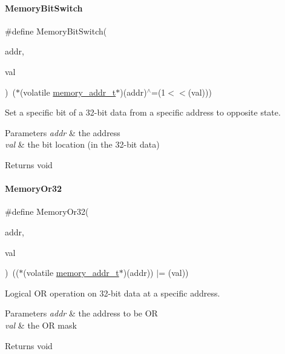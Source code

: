 \paragraph{\texorpdfstring{Memory\+Bit\+Switch}{MemoryBitSwitch}}
{\footnotesize\ttfamily \#define Memory\+Bit\+Switch(\begin{DoxyParamCaption}\item[{}]{addr,  }\item[{}]{val }\end{DoxyParamCaption})~($\ast$(volatile \mbox{\hyperlink{a00020_a06da901348542a481c297d9b700e2001}{memory\+\_\+addr\+\_\+t}}$\ast$)(addr)$^\wedge$=(1$<$$<$(val)))}



Set a specific bit of a 32-\/bit data from a specific address to opposite state. 


\begin{DoxyParams}{Parameters}
{\em addr} & the address \\
\hline
{\em val} & the bit location (in the 32-\/bit data) \\
\hline
\end{DoxyParams}
\begin{DoxyReturn}{Returns}
void 
\end{DoxyReturn}
\mbox{\label{a00020_a27874a97deab7cecdde5ddecf466e31e}} 
\paragraph{\texorpdfstring{Memory\+Or32}{MemoryOr32}}
{\footnotesize\ttfamily \#define Memory\+Or32(\begin{DoxyParamCaption}\item[{}]{addr,  }\item[{}]{val }\end{DoxyParamCaption})~(($\ast$(volatile \mbox{\hyperlink{a00020_a06da901348542a481c297d9b700e2001}{memory\+\_\+addr\+\_\+t}}$\ast$)(addr)) $\vert$= (val))}



Logical OR operation on 32-\/bit data at a specific address. 


\begin{DoxyParams}{Parameters}
{\em addr} & the address to be OR \\
\hline
{\em val} & the OR mask \\
\hline
\end{DoxyParams}
\begin{DoxyReturn}{Returns}
void 
\end{DoxyReturn}
\mbox{\label{a00020_a2d484dc15bdf30ee11ab3b05f31f0e16}} 
